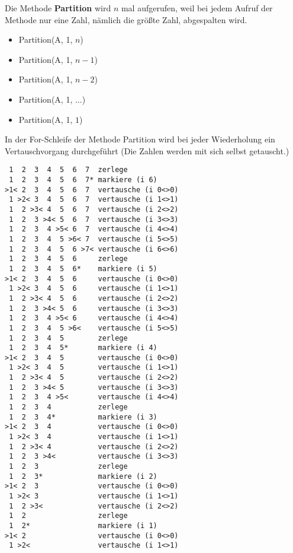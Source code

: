 \documentclass{bschlangaul-aufgabe}
\begin{document}
\begin{enumerate}
\begin{bAntwort}
Die Methode \textbf{Partition} wird $n$ mal aufgerufen, weil bei jedem
Aufruf der Methode nur eine Zahl, nämlich die größte Zahl, abgespalten
wird.

\begin{itemize}
\item Partition(A, 1, $n$)
\item Partition(A, 1, $n-1$)
\item Partition(A, 1, $n-2$)
\item Partition(A, 1, $\dots$)
\item Partition(A, 1, $1$)
\end{itemize}

In der For-Schleife der Methode Partition wird bei jeder Wiederholung
ein Vertauschvorgang durchgeführt (Die Zahlen werden mit sich
selbst getauscht.)

\begin{verbatim}
 1  2  3  4  5  6  7  zerlege
 1  2  3  4  5  6  7* markiere (i 6)
>1< 2  3  4  5  6  7  vertausche (i 0<>0)
 1 >2< 3  4  5  6  7  vertausche (i 1<>1)
 1  2 >3< 4  5  6  7  vertausche (i 2<>2)
 1  2  3 >4< 5  6  7  vertausche (i 3<>3)
 1  2  3  4 >5< 6  7  vertausche (i 4<>4)
 1  2  3  4  5 >6< 7  vertausche (i 5<>5)
 1  2  3  4  5  6 >7< vertausche (i 6<>6)
 1  2  3  4  5  6     zerlege
 1  2  3  4  5  6*    markiere (i 5)
>1< 2  3  4  5  6     vertausche (i 0<>0)
 1 >2< 3  4  5  6     vertausche (i 1<>1)
 1  2 >3< 4  5  6     vertausche (i 2<>2)
 1  2  3 >4< 5  6     vertausche (i 3<>3)
 1  2  3  4 >5< 6     vertausche (i 4<>4)
 1  2  3  4  5 >6<    vertausche (i 5<>5)
 1  2  3  4  5        zerlege
 1  2  3  4  5*       markiere (i 4)
>1< 2  3  4  5        vertausche (i 0<>0)
 1 >2< 3  4  5        vertausche (i 1<>1)
 1  2 >3< 4  5        vertausche (i 2<>2)
 1  2  3 >4< 5        vertausche (i 3<>3)
 1  2  3  4 >5<       vertausche (i 4<>4)
 1  2  3  4           zerlege
 1  2  3  4*          markiere (i 3)
>1< 2  3  4           vertausche (i 0<>0)
 1 >2< 3  4           vertausche (i 1<>1)
 1  2 >3< 4           vertausche (i 2<>2)
 1  2  3 >4<          vertausche (i 3<>3)
 1  2  3              zerlege
 1  2  3*             markiere (i 2)
>1< 2  3              vertausche (i 0<>0)
 1 >2< 3              vertausche (i 1<>1)
 1  2 >3<             vertausche (i 2<>2)
 1  2                 zerlege
 1  2*                markiere (i 1)
>1< 2                 vertausche (i 0<>0)
 1 >2<                vertausche (i 1<>1)
\end{verbatim}

\end{bAntwort}


\end{enumerate}
\end{document}
